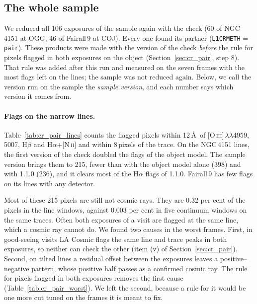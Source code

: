 \subsection{The whole sample}
\label{sec:cr_pair_sample}
We reduced all 106 exposures of the sample again with the check (60 of NGC\,4151 at OGG, 46 of Fairall\,9 at COJ).
Every one found its partner (\texttt{L1CRMETH} = \texttt{pair}). These products were made with the version of the
check \textit{before} the rule for pixels flagged in both exposures on the object (Section~\ref{sec:cr_pair}, step 8).
That rule was added after this run and measured on the seven frames with the most flags left on the lines; the sample
was not reduced again. Below, we call the version run on the sample the \textit{sample version}, and each number says
which version it comes from.

\paragraph{Flags on the narrow lines.} Table~\ref{tab:cr_pair_lines} counts the flagged pixels within 12\,\AA\ of
[O\,\textsc{iii}]\,$\lambda\lambda$4959,\,5007, H$\beta$ and H$\alpha$+[N\,\textsc{ii}] and within 8\,pixels of the
trace. On the NGC\,4151 lines, the first version of the check doubled the flags of the object model. The sample
version brings them to 215, fewer than with the object model alone (398) and with 1.1.0 (236), and it clears most of
the H$\alpha$ flags of 1.1.0. Fairall\,9 has few flags on its lines with any detector.

Most of these 215 pixels are still not cosmic rays. They are 0.32 per cent of the pixels in the line windows, against
0.003 per cent in five continuum windows on the same traces. Often both exposures of a visit are flagged at the same
line, which a cosmic ray cannot do. We found two causes in the worst frames. First, in good-seeing visits LA Cosmic
flags the same line and trace peaks in both exposures, so neither can check the other (item (v) of
Section~\ref{sec:cr_pair}). Second, on tilted lines a residual offset between the exposures leaves a
positive--negative pattern, whose positive half passes as a confirmed cosmic ray. The rule for pixels flagged in both
exposures removes the first cause (Table~\ref{tab:cr_pair_worst}). We left the second, because a rule for it would be
one more cut tuned on the frames it is meant to fix.

